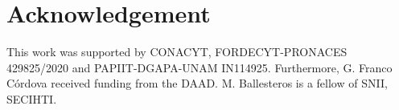\documentclass[12pt,oneside,onecolumn,open]{article}
\begin{document}
\color{black}



    






















\section*{Acknowledgement}

This work was supported  by CONACYT, FORDECYT-PRONACES 429825/2020 and PAPIIT-DGAPA-UNAM  IN114925. Furthermore, G. Franco C\'ordova received funding from the DAAD. M. Ballesteros is a fellow of SNII, SECIHTI.  


 

\end{document}

